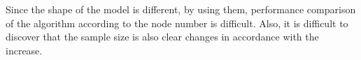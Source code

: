 Since the shape of the model is different, by using them, performance comparison of the algorithm according to the node number is difficult. Also, it is difficult to discover that the sample size is also clear changes in accordance with the increase.